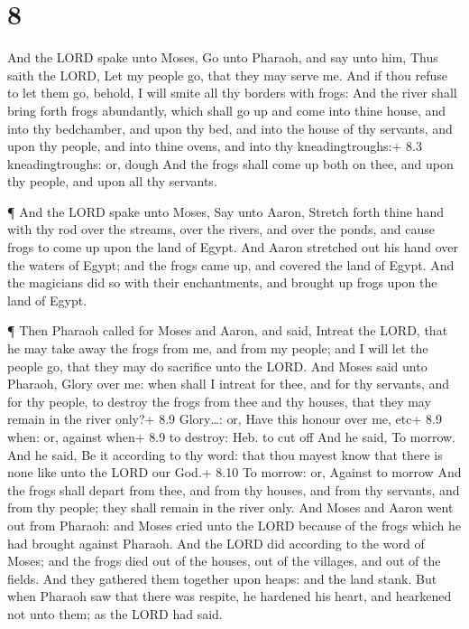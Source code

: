 \hypertarget{section-7}{%
\section{8}\label{section-7}}

 And the LORD spake unto Moses, Go unto Pharaoh, and say
unto him, Thus saith the LORD, Let my people go, that they may serve me.
 And if thou refuse to let them go, behold, I will smite all
thy borders with frogs:  And the river shall bring forth
frogs abundantly, which shall go up and come into thine house, and into
thy bedchamber, and upon thy bed, and into the house of thy servants,
and upon thy people, and into thine ovens, and into thy
kneadingtroughs:+ 8.3 kneadingtroughs: or, dough  And the
frogs shall come up both on thee, and upon thy people, and upon all thy
servants.

 ¶ And the LORD spake unto Moses, Say unto Aaron, Stretch
forth thine hand with thy rod over the streams, over the rivers, and
over the ponds, and cause frogs to come up upon the land of Egypt.
 And Aaron stretched out his hand over the waters of Egypt;
and the frogs came up, and covered the land of Egypt.  And
the magicians did so with their enchantments, and brought up frogs upon
the land of Egypt.

 ¶ Then Pharaoh called for Moses and Aaron, and said,
Intreat the LORD, that he may take away the frogs from me, and from my
people; and I will let the people go, that they may do sacrifice unto
the LORD.  And Moses said unto Pharaoh, Glory over me: when
shall I intreat for thee, and for thy servants, and for thy people, to
destroy the frogs from thee and thy houses, that they may remain in the
river only?+ 8.9 Glory\ldots: or, Have this honour over me, etc+ 8.9
when: or, against when+ 8.9 to destroy: Heb. to cut off 
And he said, To morrow. And he said, Be it according to thy word: that
thou mayest know that there is none like unto the LORD our God.+ 8.10 To
morrow: or, Against to morrow  And the frogs shall depart
from thee, and from thy houses, and from thy servants, and from thy
people; they shall remain in the river only.  And Moses and
Aaron went out from Pharaoh: and Moses cried unto the LORD because of
the frogs which he had brought against Pharaoh.  And the
LORD did according to the word of Moses; and the frogs died out of the
houses, out of the villages, and out of the fields.  And
they gathered them together upon heaps: and the land stank.
 But when Pharaoh saw that there was respite, he hardened
his heart, and hearkened not unto them; as the LORD had said.

